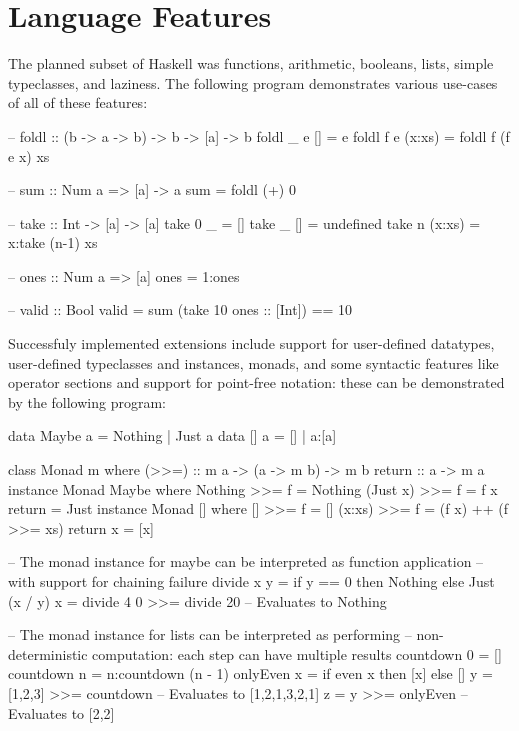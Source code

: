 \documentclass[dissertation.tex]{subfiles}
\begin{document}
\section{Language Features}
{

    The planned subset of Haskell was functions, arithmetic, booleans, lists, simple typeclasses, and laziness. The
    following program demonstrates various use-cases of all of these features:

    \begin{haskellfigure}
    -- foldl :: (b -> a -> b) -> b -> [a] -> b
    foldl _ e [] = e
    foldl f e (x:xs) = foldl f (f e x) xs

    -- sum :: Num a => [a] -> a
    sum = foldl (+) 0

    -- take :: Int -> [a] -> [a]
    take 0 _ = []
    take _ [] = undefined
    take n (x:xs) = x:take (n-1) xs

    -- ones :: Num a => [a]
    ones = 1:ones

    -- valid :: Bool
    valid = sum (take 10 ones :: [Int]) == 10
    \end{haskellfigure}

    Successfuly implemented extensions include support for user-defined datatypes, user-defined typeclasses and
    instances, monads, and some syntactic features like operator sections and support for point-free notation: these can
    be demonstrated by the following program:

    \begin{haskellfigure}
    data Maybe a = Nothing | Just a
    data [] a = [] | a:[a]
    
    class Monad m where
        (>>=) :: m a -> (a -> m b) -> m b
        return :: a -> m a
    instance Monad Maybe where
        Nothing >>= f = Nothing
        (Just x) >>= f = f x
        return = Just
    instance Monad [] where
        [] >>= f = []
        (x:xs) >>= f = (f x) ++ (f >>= xs)
        return x = [x]

    -- The monad instance for maybe can be interpreted as function application
    -- with support for chaining failure
    divide x y = if y == 0 then Nothing else Just (x / y)
    x = divide 4 0 >>= divide 20 -- Evaluates to Nothing

    -- The monad instance for lists can be interpreted as performing
    -- non-deterministic computation: each step can have multiple results
    countdown 0 = []
    countdown n = n:countdown (n - 1)
    onlyEven x = if even x then [x] else []
    y = [1,2,3] >>= countdown -- Evaluates to [1,2,1,3,2,1]
    z = y >>= onlyEven -- Evaluates to [2,2]
    \end{haskellfigure}

}
\end{document}
